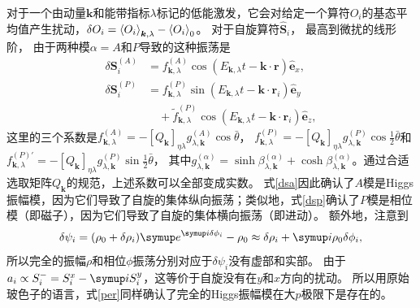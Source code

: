 对于一个由动量$\bm{k}$和能带指标$\lambda$标记的低能激发，它会对给定一个算符$O_i$的基态平均值产生扰动，$\delta O_i = \expval{O_i}_{\bm k,\lambda}-\expval{O_i}_0$。
对于自旋算符$\hat{\bm{S}}_i$，
最高到微扰的线形阶，
由于两种模$\alpha = A$和$P$导致的这种振荡是
\begin{subequations}\label{per}
    \begin{align}
        \delta \bm{S}_i^{(A)} &= f^{(A)}_{\bm{k}, \lambda} \cos (E_{
  \bm{k},\lambda} t -\bm{k} \cdot \bm{r}) \hat{\bm{e}}_x,
  \label{dsa}\\
   \delta \bm{S}_i^{(P)} &= f^{(P)}_{ \bm{k}, \lambda} \sin (E_{\bm{k},
  \lambda} t -\bm{k} \cdot \bm{r}_i) \hat{\bm{e}}_y \nonumber\\
 &\quad + \tilde f^{(P)}_{\bm{k}, \lambda} \cos (E_{\bm{k}, \lambda} t -\bm{k} \cdot
  \bm{r}_i) \hat{\bm{e}}_z, \label{dsp}
    \end{align}
\end{subequations}
这里的三个系数是$f^{(A)}_{\bm{k}, \lambda} = - [Q_{\bm{k}}]_{\eta \lambda} g^{(A)}_{\lambda, \bm{k}} \cos \bar{\theta}$，
$f^{(P)}_{\bm{k}, \lambda}= - [Q_{\bm{k}}]_{\eta \lambda} g^{(P)}_{\lambda, \bm{k}} \cos\frac{1}{2}\bar{\theta}$和$f^{(P)\prime}_{\bm{k}, \lambda} = -[Q_{\bm{k}}]_{\eta \lambda} g^{(P)}_{\lambda, \bm{k}} \sin\frac{1}{2}\bar{\theta}$，
其中$g^{(\alpha)}_{\lambda, \bm{k}} = \sinh\beta^{(\alpha)}_{\lambda, \bm{k}} + \cosh \beta^{(\alpha)}_{\lambda,
\bm{k}}$。通过合适选取矩阵$Q_{\bm{k}}$的规范，上述系数可以全部变成实数。
式\eqref{dsa}因此确认了$A$模是Higgs振幅模，因为它们导致了自旋的集体纵向振荡；类似地，式\eqref{dsp}确认了$P$模是相位模（即磁子），因为它们导致了自旋的集体横向振荡（即进动）。
额外地，注意到
\begin{equation}
  \delta\psi_i = (\rho_0 + \delta \rho_i) \eu^{\iu \delta \phi_i} - \rho_0
  \approx \delta \rho_i + \iu \rho_0 \delta \phi_i, \label{op}
\end{equation}
所以完全的振幅$\rho$和相位$\phi$振荡分别对应于$\delta \psi_i$没有虚部和实部。
由于$a_i \propto S_i^- = S_i^x - \iu S_i^y$，这等价于自旋没有在$y$和$x$方向的扰动。
所以用原始玻色子的语言，式\eqref{per}同样确认了完全的Higgs振幅模在大$p$极限下是存在的。

